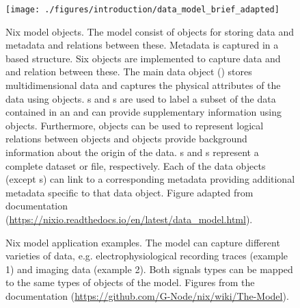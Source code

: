 \begin{figure}
 \texttt{[image: ./figures/introduction/data\_model\_brief\_adapted]}
 \caption[Nix model objects]{Nix model objects. The model consist of objects for storing data and metadata and relations between these. Metadata is captured in a  based structure. Six objects are implemented to capture data and and relation between these. The main data object () stores multidimensional data and captures the physical attributes of the data using  objects. s and s are used to label a subset of the data contained in an  and can provide supplementary information using  objects. Furthermore,  objects can be used to represent logical relations between objects and  objects provide background information about the origin of the data. s and s represent a complete dataset or file, respectively. Each of the data objects (except s) can link to a corresponding metadata  providing additional metadata specific to that data object. Figure adapted from  documentation (\url{https://nixio.readthedocs.io/en/latest/data_model.html}).}
 \label{fig:intro_nix_model}
\end{figure}

\begin{figure}
 \centering
 \scalebox{0.45}{
 }
 \caption[Nix model application examples]{Nix model application examples. The model can capture different varieties of data, e.g. electrophysiological recording traces (example 1) and imaging data (example 2). Both signals types can be mapped to the same types of objects of the  model. Figures from  the documentation (\url{https://github.com/G-Node/nix/wiki/The-Model}).}
 \label{fig:intro_nix_examples}
\end{figure}


